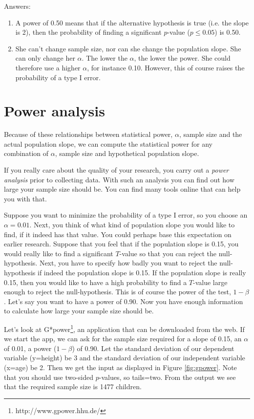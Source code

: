 \documentclass[]{report}\usepackage[]{graphicx}\usepackage[]{color}
\begin{document}
Answers:

\begin{enumerate}

\item A power of 0.50 means that if the alternative hypothesis is true (i.e. the slope is 2), then the probability of finding a significant $p$-value ($p \leq 0.05$) is 0.50.

\item She can't change sample size, nor can she change the population slope. She can only change her $\alpha$. The lower the $\alpha$, the lower the power. She could therefore use a higher $\alpha$, for instance 0.10. However, this of course raises the probability of a type I error.


\end{enumerate}


\section{Power analysis}
Because of these relationships between statistical power, $\alpha$, sample size and the actual population slope, we can compute the statistical power for any combination of $\alpha$, sample size and hypothetical population slope.


If you really care about the quality of your research, you carry out a \textit{power analysis} prior to collecting data. With such an analysis you can find out how large your sample size should be. You can find many tools online that can help you with that.

Suppose you want to minimize the probability of a type I error, so you choose an $\alpha=0.01$. Next, you think of what kind of population slope you would like to find, if it indeed has that value. You could perhaps base this expectation on earlier research. Suppose that you feel that if the population slope is 0.15, you would really like to find a significant $T$-value so that you can reject the null-hypothesis. Next, you have to specify how badly you want to reject the null-hypothesis if indeed the population slope is 0.15. If the population slope is really 0.15, then you would like to have a high probability to find a $T$-value large enough to reject the null-hypothesis. This is of course the power of the test, $1-\beta$. Let's say you want to have a power of 0.90. Now you have enough information to calculate how large your sample size should be.

Let's look at G*power\footnote{http://www.gpower.hhu.de/}, an application that can be downloaded from the web. If we start the app, we can ask for the sample size required for a slope of 0.15, an $\alpha$ of 0.01, a power ($1-\beta$) of 0.90. Let the standard deviation of our dependent variable (y=height) be 3 and the standard deviation of our independent variable (x=age) be 2. Then we get the input as displayed in Figure \ref{fig:gpower}. Note that you should use two-sided $p$-values, so tails=two. From the output we see that the required sample size is 1477 children.
\end{document}
